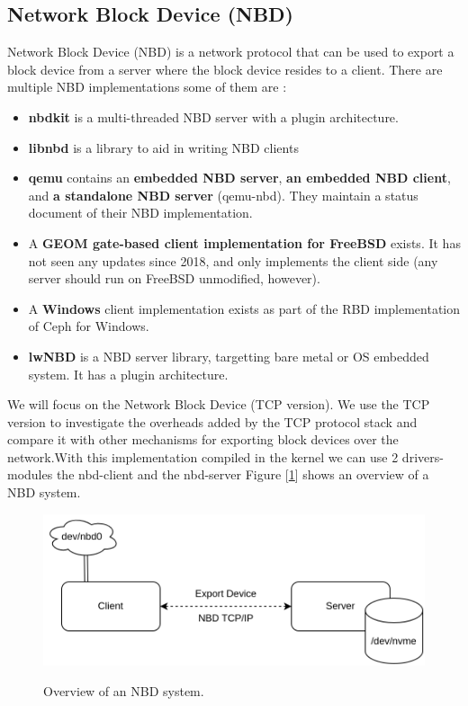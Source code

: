 \documentclass[nonacm,sigplan]{acmart}
\begin{document}
\subsection{Network Block Device (NBD)}
 Network Block Device (NBD) is a network protocol that can be used to export a block device from a server where the block device resides to a client. There are multiple NBD implementations
 some of them are :
 \begin{itemize}
 \item  \textbf{nbdkit} is a multi-threaded NBD server with a plugin architecture.
 \item  \textbf{libnbd} is a library to aid in writing NBD clients
 \item  \textbf{qemu} contains an \textbf{embedded NBD server}, \textbf{an embedded NBD client}, and \textbf{a standalone NBD server} (qemu-nbd). They maintain a status document of their NBD implementation.
 \item  A \textbf{GEOM gate-based client implementation for FreeBSD} exists. It has not seen any updates since 2018, and only implements the client side (any server should run on FreeBSD unmodified, however).
 \item  A \textbf{Windows} client implementation exists as part of the RBD implementation of Ceph for Windows.
 \item  \textbf{lwNBD} is a NBD server library, targetting bare metal or OS embedded system. It has a plugin architecture.
 \end{itemize}
 We will focus on the Network Block Device (TCP version). We use the TCP version to investigate the overheads added by the TCP protocol stack and compare it with other mechanisms for exporting block devices over the network.With this implementation compiled in the kernel we can use 2 drivers-modules the nbd-client and the nbd-server Figure [\ref{fig:nbd_path}] shows an overview of a NBD system.
 \begin{figure}[h]
    \includegraphics[scale=0.22]{figures/nbd-path.png}\\
    \caption{Overview of an NBD system.}
    \label{fig:nbd_path}
  \end{figure}
\end{document}
